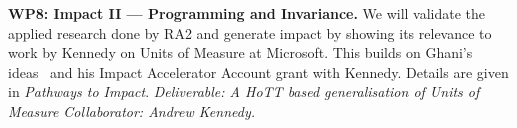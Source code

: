 \documentclass[a4paper,11pt]{article}
\begin{document}




{\bf WP8: Impact II --- Programming and Invariance.} %
We will validate the applied research done by RA2 and generate impact
by showing its relevance to work by Kennedy on Units of Measure at
Microsoft. This builds on Ghani's ideas~\cite{uom} and his Impact
Accelerator Account grant
with Kennedy.
%
Details are given in {\em Pathways to
  Impact}. {\em Deliverable: A HoTT based generalisation of Units of Measure
Collaborator: Andrew Kennedy.
}
\end{document}
